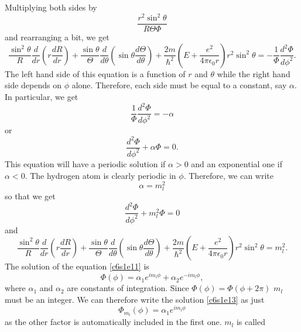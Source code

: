 Multiplying both sides by
\[
\frac{r^2\sin^2\theta}{R\Theta\Phi}
\]
and rearranging a bit, we get
\begin{equation}\label{c6s1e7}
\frac{\sin^2\theta}{R}\frac{d}{dr}\left(r\frac{dR}{dr}\right) +
\frac{\sin\theta}{\Theta}\frac{d}{d\theta}
\left(\sin\theta\frac{d\Theta}{d\theta}\right) +
\frac{2m}{\hslash^2}\left(E + \frac{e^2}{4\pi\epsilon_0 r}\right)
r^2\sin^2\theta =
-\frac{1}{\Phi}\frac{d^2\Phi}{d\phi^2}. 
\end{equation}
The left hand side of this equation is a function of $r$ and $\theta$ while
the right hand side depends on $\phi$ alone. Therefore, each side must be equal
to a constant, say $\alpha$. In particular, we get
\begin{equation}\label{c6s1e8}
\frac{1}{\Phi}\frac{d^2\Phi}{d\phi^2} = -\alpha
\end{equation}
or
\begin{equation}\label{c6s1e9}
\frac{d^2\Phi}{d\phi^2} + \alpha\Phi = 0.
\end{equation}
This equation will have a periodic solution if $\alpha > 0$ and an exponential
one if $\alpha < 0$. The hydrogen atom is clearly periodic in $\phi$. Therefore,
we can write
\begin{equation}\label{c6s1e10}
\alpha = m_l^2
\end{equation} 
so that we get
\begin{equation}\label{c6s1e11}
\frac{d^2\Phi}{d\phi^2} + m_l^2\Phi = 0
\end{equation}
and
\begin{equation}\label{c6s1e12}
\frac{\sin^2\theta}{R}\frac{d}{dr}\left(r\frac{dR}{dr}\right) +
\frac{\sin\theta}{\Theta}\frac{d}{d\theta}
\left(\sin\theta\frac{d\Theta}{d\theta}\right) +
\frac{2m}{\hslash^2}\left(E + \frac{e^2}{4\pi\epsilon_0r}\right)
r^2\sin^2\theta = m_l^2.
\end{equation}
The solution of the equation \eqref{c6s1e11} is
\begin{equation}\label{c6s1e13}
\Phi(\phi) = \alpha_1 e^{im_l\phi} + \alpha_2 e^{-im_l\phi},
\end{equation}
where $\alpha_1$ and $\alpha_2$ are constants of integration. Since $\Phi(\phi)
= \Phi(\phi + 2\pi)$ $m_l$ must be an integer. We can therefore write the 
solution \eqref{c6s1e13} as just
\begin{equation}\label{c6s1e13}
\Phi_{m_l}(\phi) = \alpha_1 e^{im_l\phi}
\end{equation}
as the other factor is automatically included in the first one. $m_l$ is called
